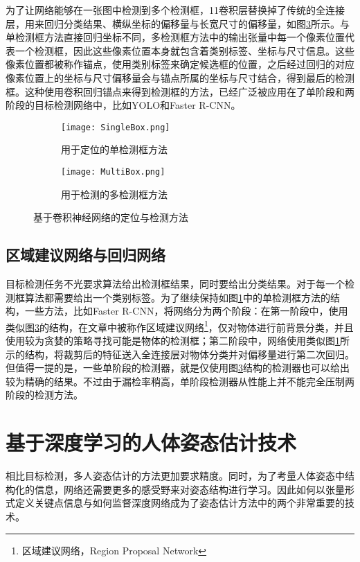 为了让网络能够在一张图中检测到多个检测框，1\times1卷积层替换掉了传统的全连接层，用来回归分类结果、横纵坐标的偏移量与长宽尺寸的偏移量，如图\ref{fig:MultiBox}所示。与单检测框方法直接回归坐标不同，多检测框方法中的输出张量中每一个像素位置代表一个检测框，因此这些像素位置本身就包含着类别标签、坐标与尺寸信息。这些像素位置都被称作锚点，使用类别标签来确定候选框的位置，之后经过回归的对应像素位置上的坐标与尺寸偏移量会与锚点所属的坐标与尺寸结合，得到最后的检测框。这种使用卷积回归锚点来得到检测框的方法，已经广泛被应用在了单阶段和两阶段的目标检测网络中，比如YOLO\cite{redmon2016you}和Faster R-CNN\cite{Ren2015Faster}。

\begin{figure}[h]	
	\centering
	\begin{subfigure}[b]{0.3\textwidth}
		\texttt{[image: SingleBox.png]}
		\caption{用于定位的单检测框方法}
		\label{fig:SingleBox}
	\end{subfigure}
	\hskip1.5cm
	\begin{subfigure}[b]{0.3\textwidth}
		\texttt{[image: MultiBox.png]}
		\caption{用于检测的多检测框方法}
		\label{fig:MultiBox}
	\end{subfigure}
	\caption{基于卷积神经网络的定位与检测方法}
\end{figure}

\subsection{区域建议网络与回归网络}
\label{subsec:factsRPNregression}
目标检测任务不光要求算法给出检测框结果，同时要给出分类结果。对于每一个检测框算法都需要给出一个类别标签。为了继续保持如图\ref{fig:SingleBox}中的单检测框方法的结构，一些方法，比如Faster R-CNN\cite{Ren2015Faster}，将网络分为两个阶段：在第一阶段中，使用类似图\ref{fig:MultiBox}的结构，在文章中被称作区域建议网络\footnote{区域建议网络，Region Proposal Network}，仅对物体进行前背景分类，并且使用较为贪婪的策略寻找可能是物体的检测框；第二阶段中，网络使用类似图\ref{fig:SingleBox}所示的结构，将裁剪后的特征送入全连接层对物体分类并对偏移量进行第二次回归。但值得一提的是，一些单阶段的检测器，就是仅使用图\ref{fig:MultiBox}结构的检测器也可以给出较为精确的结果。不过由于漏检率稍高，单阶段检测器从性能上并不能完全压制两阶段的检测方法。

\section{基于深度学习的人体姿态估计技术}
\label{sec:factspose}
相比目标检测，多人姿态估计的方法更加要求精度。同时，为了考量人体姿态中结构化的信息，网络还需要更多的感受野来对姿态结构进行学习。因此如何以张量形式定义关键点信息与如何监督深度网络成为了姿态估计方法中的两个非常重要的技术。


